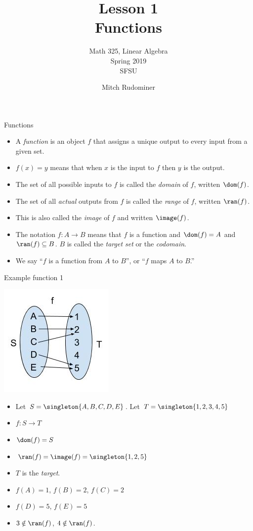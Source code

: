 \documentclass{beamer}
\title{Lesson 1 \\ Functions}
\subtitle{Math 325, Linear Algebra \\ Spring 2019 \\ SFSU}
\author{Mitch Rudominer}
\date{}
\begin{document}
\begin{frame}
  \titlepage
\end{frame}


\begin{frame}{Functions}

  \begin{itemize}
  \item  A \emph{function} is an object $f$ that assigns a unique output
  to every input from a given set.
  \item $f(x) = y$ means that when $x$ is the input to $f$ then $y$ is the output.
  \item The set of all possible inputs to $f$ is called the \emph{domain} of $f$,
  written $\dom(f)$.
  \item The set of all \emph{actual} outputs from $f$ is called the \emph{range} of $f$,
  written $\ran(f)$.
  \item This is also called the \emph{image} of $f$ and written $\image(f)$.
  \item The notation $f:A \to B$ means that $f$ is a function and
  $\dom(f)=A$ and $\ran(f)\subseteq B$. $B$ is called the \emph{target set}
  or the \emph{codomain}.
  \item We say ``$f$ is a function from $A$ to $B$'', or ``$f$ maps $A$ to $B$.''
  \end{itemize}


\end{frame}

\begin{frame}{Example function 1}
\begin{center}
\includegraphics[scale=0.25]{function1}
\end{center}

\begin{itemize}
\item Let $S=\singleton{A,B,C,D,E}$. Let $T=\singleton{1,2,3,4,5}$
\item $f:S\to T$
\item $\dom(f) = S$
\item $\ran(f) = \image(f) = \singleton{1,2,5}$
\item $T$ is the \emph{target}.
\item $f(A) = 1$, $f(B) = 2$, $f(C)=2$
\item $f(D) = 5$, $f(E) = 5$
\item $3 \notin \ran(f)$, $4\notin\ran(f)$.
\end{itemize}
\end{frame}
\end{document}
